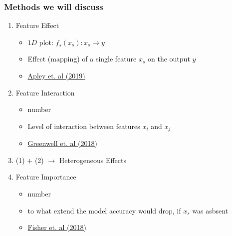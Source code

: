 \begin{frame}
  \frametitle{Methods we will discuss}

  \begin{enumerate}
  \item Feature Effect
    \begin{itemize}
      \item $1D$ plot: \(f_s(x_s): x_s \rightarrow y\)
      \item Effect (mapping) of a single feature \(x_s\) on the output \(y\)
      \item \href{https://arxiv.org/abs/1612.08468}{Apley et. al (2019)}
    \end{itemize}
  \item Feature Interaction
    \begin{itemize}
    \item number
    \item Level of interaction between features \(x_i\) and \(x_j\)
    \item \href{https://arxiv.org/abs/1805.04755}{Greenwell et. al (2018)}
    \end{itemize}
  \item (1) + (2) $\rightarrow$ Heterogeneous Effects
  \item Feature Importance
    \begin{itemize}
      \item number
      \item to what extend the model accuracy would drop, if \(x_s\) was asbsent
        \item \href{https://arxiv.org/abs/1801.01489}{Fisher et. al (2018)}
    \end{itemize}

  \end{enumerate}

\end{frame}
